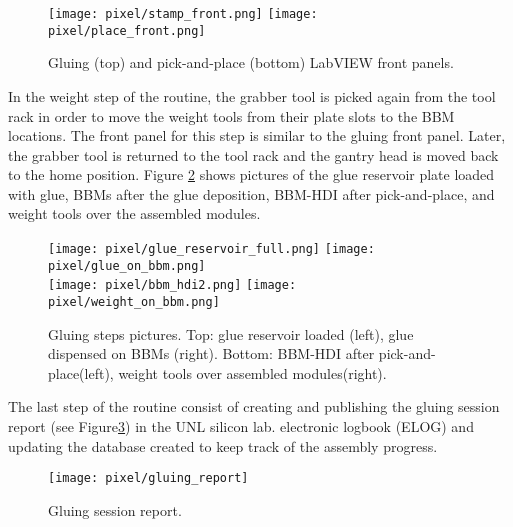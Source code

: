 \begin{figure}[h]
\begin{center}
  \texttt{[image: pixel/stamp\_front.png]}
  \texttt{[image: pixel/place\_front.png]}
 \caption[Gluing and pick-and-place LabVIEW front panels]{Gluing (top) and pick-and-place (bottom) LabVIEW front panels.}\label{fig:stamp_place_front}
\end{center}
\end{figure}

In the weight step of the routine, the grabber tool is picked again from the tool rack in order to move the weight tools from their plate slots to the BBM locations. The front panel for this step is similar to the gluing front panel. Later, the grabber tool is returned to the tool rack and the gantry head is moved back to the home position. Figure \ref{fig:gluing_steps} shows pictures of the glue reservoir plate loaded with glue, BBMs after the glue deposition, BBM-HDI after pick-and-place, and weight tools over the assembled modules. 

\begin{figure}[h]
\begin{center}
  \texttt{[image: pixel/glue\_reservoir\_full.png]}
  \texttt{[image: pixel/glue\_on\_bbm.png]}\\
  \texttt{[image: pixel/bbm\_hdi2.png]}
  \texttt{[image: pixel/weight\_on\_bbm.png]}
  \caption[Gluing steps pictures.]{Gluing steps pictures. Top: glue reservoir loaded (left), glue dispensed on BBMs (right). Bottom: BBM-HDI after pick-and-place(left), weight tools over assembled modules(right).}\label{fig:gluing_steps}
\end{center}
\end{figure}

The last step of the routine consist of creating and publishing the gluing session report (see Figure\ref{fig:gluing_report}) in the UNL silicon lab. electronic logbook (ELOG) and updating the database created to keep track of the assembly progress.  

\begin{figure}[h]
\begin{center}
  \texttt{[image: pixel/gluing\_report]}
 \caption[Gluing session report.]{Gluing session report.}\label{fig:gluing_report}
\end{center}
\end{figure}

